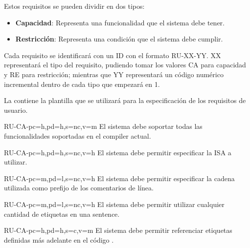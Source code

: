 \noindent
Estos requisitos se pueden dividir en dos tipos:

\begin{itemize}
    \item \textbf{Capacidad}: Representa una funcionalidad que el sistema debe tener.
    \item \textbf{Restricción}: Representa una condición que el sistema debe cumplir.
\end{itemize}

Cada requisito se identificará con un ID con el formato RU-XX-YY. XX
representará el tipo del requisito, pudiendo tomar los valores CA para capacidad
y RE para restricción; mientras que YY representará un código numérico incremental
dentro de cada tipo que empezará en 1.

La  contiene la plantilla que se utilizará para la
especificación de los requisitos de usuario.




\setcounter{i}{1}

\begin{userReq}{RU-CA-}{pc=h,pd=h,s=nc,v=m}
    El sistema debe soportar todas las funcionalidades soportadas en el
    \gls{compiler} actual.
\end{userReq}

\begin{userReq}{RU-CA-}{pc=h,pd=h,s=nc,v=h}
    El sistema debe permitir especificar la \gls{ISA} a utilizar.
\end{userReq}

\begin{userReq}{RU-CA-}{pc=m,pd=l,s=nc,v=h}
    El sistema debe permitir especificar la cadena utilizada como prefijo de los
    comentarios de línea.
\end{userReq}

\begin{userReq}{RU-CA-}{pc=m,pd=l,s=nc,v=h}
    El sistema debe permitir utilizar cualquier cantidad de etiquetas en una
    \gls{sentence}.
\end{userReq}

\begin{userReq}{RU-CA-}{pc=h,pd=h,s=c,v=m}
    El sistema debe permitir referenciar etiquetas definidas más adelante en el
    código .
\end{userReq}

